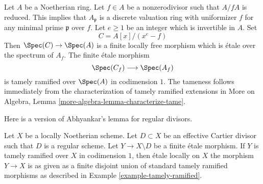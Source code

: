 \begin{example}
\label{example-tamely-ramified}
Let $A$ be a Noetherian ring. Let $f \in A$ be a nonzerodivisor
such that $A/fA$ is reduced. This implies that $A_\mathfrak p$
is a discrete valuation ring with uniformizer $f$ for any
minimal prime $\mathfrak p$ over $f$. Let $e \geq 1$ be an integer which
is invertible in $A$. Set
$$
C = A[x]/(x^e - f)
$$
Then $\Spec(C) \to \Spec(A)$ is a finite locally free morphism
which is \'etale over the spectrum of $A_f$. The finite \'etale morphism
$$
\Spec(C_f) \longrightarrow \Spec(A_f)
$$
is tamely ramified over $\Spec(A)$ in codimension $1$. The
tameness follows immediately from the characterization of tamely ramified
extensions in
More on Algebra, Lemma \ref{more-algebra-lemma-characterize-tame}.
\end{example}

\noindent
Here is a version of Abhyankar's lemma for regular divisors.

\begin{lemma}
\label{lemma-abhyankar-one-divisor}
Let $X$ be a locally Noetherian scheme. Let $D \subset X$
be an effective Cartier divisor such that $D$ is a regular scheme.
Let $Y \to X \setminus D$ be a finite \'etale morphism.
If $Y$ is tamely ramified over $X$ in codimension $1$, then
\'etale locally on $X$ the morphism $Y \to X$ is as given
as a finite disjoint union of standard tamely ramified
morphisms as described in Example \ref{example-tamely-ramified}.
\end{lemma}


